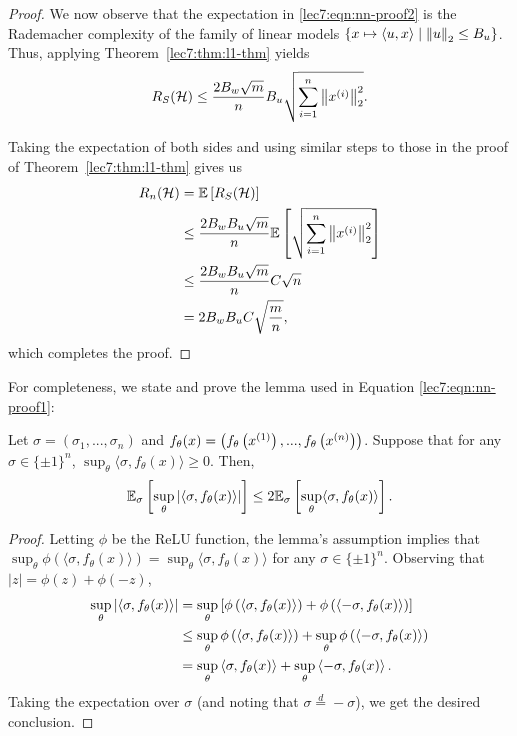 \begin{proof}
    We now observe that the expectation in \eqref{lec7:eqn:nn-proof2} is the Rademacher complexity of the family of linear models $\{x \mapsto \left\langle u,x\right\rangle \mid \left\|u\right\|_2\leq B_u\}$. Thus, applying Theorem~\ref{lec7:thm:l1-thm} yields
    \begin{equation}
        R_S(\mathcal{H}) \leq \frac{2B_w\sqrt{m}}{n}B_u\sqrt{\sum_{i=1}^n \left\|x^{(i)}\right\|_2^2}.
    \end{equation}
    
    Taking the expectation of both sides and using similar steps to those in the proof of Theorem~\ref{lec7:thm:l1-thm} gives us
    \begin{align}
        R_n(\mathcal{H})  &= \mathbb{E}\left[ R_S(\mathcal{H})\right] \\
        &\leq \frac{2B_wB_u\sqrt{m}}{n} \mathbb{E}\left[\sqrt{\sum_{i=1}^n \left\|x^{(i)}\right\|_2^2}\right] \\
        &\leq \frac{2B_wB_u\sqrt{m}}{n} C\sqrt{n} \\
        &= 2 B_w B_u C\sqrt{\frac{m}{n}},
    \end{align}
    which completes the proof.
    
\end{proof}

For completeness, we state and prove the lemma used in Equation \eqref{lec7:eqn:nn-proof1}:

\begin{lemma}\label{lec7:lemma:absfortwo}
Let $\sigma = (\sigma_1, ..., \sigma_n)$ and $f_{\theta}(x) = \left(f_{\theta}\left(x^{(1)}\right), ...,  f_{\theta}\left(x^{(n)} \right)\right)$. Suppose that for any $\sigma \in \{\pm 1\}^n$, $\sup_{\theta} \langle \sigma, f_{\theta}(x) \rangle \geq 0$. Then, 
\begin{equation}
\mathbb{E}_{\sigma}\left[ \sup_{\theta}  \left | \langle \sigma, f_{\theta}(x) \rangle \right|  \right] \leq 2 \mathbb{E}_{\sigma}\left[ \sup_{\theta}  \langle \sigma, f_{\theta}(x) \rangle   \right].
\end{equation}
\end{lemma}

\begin{proof}
Letting $\phi$ be the ReLU function, the lemma's assumption implies that $\sup_{\theta} \phi\left(\langle \sigma, f_{\theta}(x) \rangle\right) = \sup_{\theta}\langle \sigma, f_{\theta}(x) \rangle$ for any $\sigma \in \{\pm 1\}^n$. Observing that $|z| = \phi(z) + \phi(-z)$, 
\begin{align}
\sup_{\theta} \abs{\inprod{ \sigma, f_{\theta}(x) }}%
&= \sup_{\theta} \left[ \phi \l(\inprod{ \sigma, f_{\theta}(x) } \r) + \phi \l(\inprod{-\sigma, f_{\theta}(x) } \r)\right] \\
&\le \sup_{\theta}  \phi \l(\inprod{ \sigma, f_{\theta}(x) } \r) +  \sup_{\theta}  \phi \l(\inprod{-\sigma, f_{\theta}(x) } \r)  \\
&= \sup_{\theta} \inprod{ \sigma, f_{\theta}(x) } +  \sup_{\theta}  \inprod{-\sigma, f_{\theta}(x) }. 
\end{align}
Taking the expectation over $\sigma$ (and noting that $\sigma \overset d = -\sigma$), we get the desired conclusion.
\end{proof}


